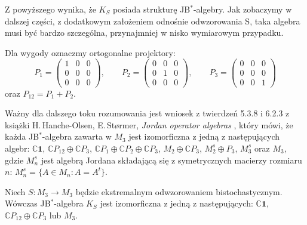 {Z powyższego wynika, że $K_{S}$ posiada strukturę JB$^{*}$-algebry.
Jak zobaczymy w dalszej części,
z dodatkowym założeniem odnośnie odwzorowania S,
taka algebra musi być bardzo szczególna,
przynajmniej w nisko wymiarowym przypadku.

Dla wygody oznaczmy ortogonalne projektory:
\begin{equation}
\label{def:OrthogonalProjections}
    P_{1} = \begin{pmatrix}
        1 & 0 & 0 \\
        0 & 0 & 0 \\
        0 & 0 & 0
    \end{pmatrix} , \quad \quad
    P_{2} = \begin{pmatrix}
        0 & 0 & 0 \\
        0 & 1 & 0 \\
        0 & 0 & 0
    \end{pmatrix} , \quad \quad
    P_{3} = \begin{pmatrix}
        0 & 0 & 0 \\
        0 & 0 & 0 \\
        0 & 0 & 1
    \end{pmatrix}
\end{equation}
oraz $P_{12} = P_{1} + P_{2}$.

Ważny dla dalszego toku rozumowania jest wniosek z twierdzeń 5.3.8 i 6.2.3
z książki
H.\,Hanche-Olsen, E.\,St{\o}rmer,
\emph{Jordan operator algebras} \cite{Hanche1984},
który mówi, że każda JB$^{*}$-algebra zawarta w $M_{3}$
jest izomorficzna z jedną z następujących algebr:
$\mathbb{C}\mathbf{1}$,
$\mathbb{C} P_{12} \oplus \mathbb{C} P_{3}$,
$\mathbb{C} P_{1} \oplus \mathbb{C} P_{2} \oplus \mathbb{C} P_{3}$,
$M_{2} \oplus \mathbb{C} P_{3}$,
$M_{2}^{s} \oplus P_{3}$,
$M_{3}^{s}$ oraz $M_{3}$,
gdzie $M_{n}^{s}$ jest algebrą Jordana składającą się z symetrycznych
macierzy rozmiaru $n$: $M_{n}^{s} = \{ A \in M_{n}: A = A^{t} \}$.

\begin{Theorem}
\label{thm:ExposedMaps}
Niech $S\!: M_{3} \rightarrow M_{3}$ będzie ekstremalnym odwzorowaniem
bistochastycznym.
Wówczas JB$^{*}$-algebra $K_{S}$ jest izomorficzna z jedną z następujących:
$\mathbb{C}\mathbf{1}$, $\mathbb{C} P_{12} \oplus \mathbb{C} P_{3}$
lub
$M_{3}$.
\end{Theorem}

}
